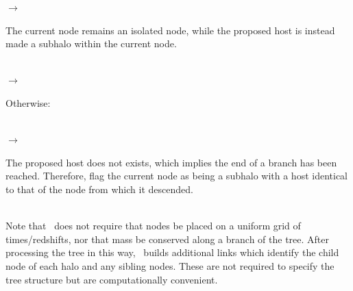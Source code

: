 \noindent\hspace{30mm} $\rightarrow$ \parbox[t]{125mm}{The current node remains an isolated node, while the proposed host is instead made a subhalo within the current node.}\\

\noindent\hspace{20mm} $\rightarrow$ \parbox[t]{135mm}{Otherwise:}\\

\noindent\hspace{25mm} $\rightarrow$ \parbox[t]{130mm}{The proposed host does not exists, which implies the end of a branch has been reached. Therefore, flag the current node as being a subhalo with a host identical to that of the node from which it descended.}\\

Note that \glc\ does not require that nodes be placed on a uniform grid of times/redshifts, nor that mass be conserved along a branch of the tree. After processing the tree in this way, \glc\ builds additional links which identify the child node of each halo and any sibling nodes. These are not required to specify the tree structure but are computationally convenient.
